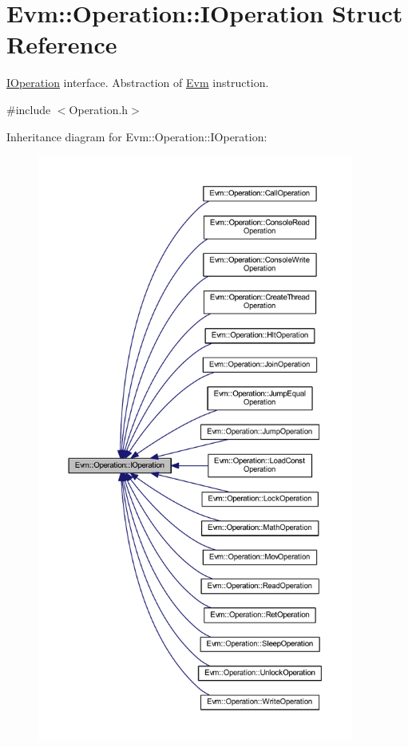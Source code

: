\hypertarget{struct_evm_1_1_operation_1_1_i_operation}{}\section{Evm\+:\+:Operation\+:\+:I\+Operation Struct Reference}
\label{struct_evm_1_1_operation_1_1_i_operation}


\mbox{\hyperlink{struct_evm_1_1_operation_1_1_i_operation}{I\+Operation}} interface. Abstraction of \mbox{\hyperlink{namespace_evm}{Evm}} instruction.  




{\ttfamily \#include $<$Operation.\+h$>$}



Inheritance diagram for Evm\+:\+:Operation\+:\+:I\+Operation\+:
\nopagebreak
\begin{figure}[H]
\begin{center}
\leavevmode
\includegraphics[height=550pt]{struct_evm_1_1_operation_1_1_i_operation__inherit__graph}
\end{center}
\end{figure}
